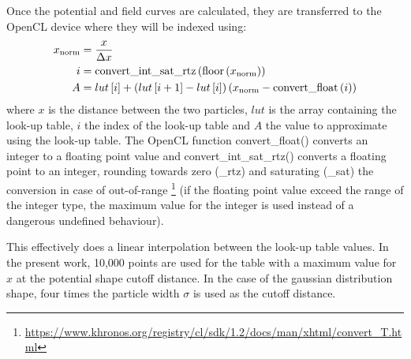 Once the potential and field curves are calculated, they are transferred to the
OpenCL device where they will be indexed using:
\begin{align}
x_{\textrm{norm}} & = \frac{x}{\Delta x} \\
i   & = \textrm{convert\_int\_sat\_rtz}\left( \textrm{floor}\left( x_{\textrm{norm}} \right) \right) \\
A   &= lut\left[ i \right] + \left( lut\left[ i+1 \right]-lut\left[ i \right] \right) \left( x_{\textrm{norm}}-\textrm{convert\_float}\left( i \right) \right)
\end{align}
where $x$ is the distance between the two particles, $lut$ is the array
containing the look-up table, $i$ the index of the look-up table and $A$ the
value to approximate using the look-up table. The OpenCL function
convert\_float() converts an integer to a floating point value
and convert\_int\_sat\_rtz() converts a floating point to an integer,
rounding towards zero (\_rtz) and saturating (\_sat) the conversion in case of
out-of-range
\footnote{\url{https://www.khronos.org/registry/cl/sdk/1.2/docs/man/xhtml/convert_T.html}}
(if the floating point value exceed the range of the integer type,
the maximum value for the integer is used instead of a dangerous undefined
behaviour).

This effectively does a linear interpolation between the look-up table values.
In the present work, 10,000 points are used for the table with a maximum value
for $x$ at the potential shape cutoff distance. In the case of the gaussian
distribution shape, four times the particle width $\sigma$ is used as the cutoff
distance.


